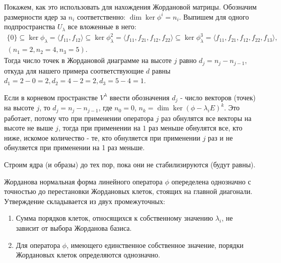 \begin{algorithm}

    Покажем, как это использовать для нахождения Жордановой матрицы. Обозначим размерности ядер за $n_i$ соответственно: $\dim \ker \phi^i = n_i$. Выпишем для одного подпространства $U_{\lambda}$ все вложенные в него:
    \begin{eqnarray}  
        \{0\} \subseteq \ker \phi_{\lambda} = \langle f_{11}, f_{12}\rangle \subseteq \ker \phi_{\lambda}^2 
        = \langle f_{11}, f_{21}, f_{12}, f_{22} \rangle \subseteq \ker \phi_{\lambda}^3 = 
        \langle f_{11}, f_{21}, f_{12}, f_{22}, f_{13} \rangle, \\ (n_1 = 2, n_2 = 4, n_3 = 5).
    \end{eqnarray}
    Тогда число точек в Жордановой диаграмме на высоте $j$ равно $d_j = n_j - n_{j-1}$, откуда для нашего примера соответствующие $d$ равны $d_1 = 2-0=2, d_2 = 4-2=2, d_3 = 5-4=1$.
    
    Если в корневом пространстве $V^{\lambda}$ ввести обозначения $d_j$ - число векторов (точек) на высоте $j$, то $d_j = n_j - n_{j-1}$, где $n_0 = 0$, $n_k = \dim \ker (\phi - \lambda_i E)^k$.
    Это работает, потому что при применении оператора $j$ раз обнулятся все векторы на высоте не выше $j$, 
    тогда при применении на $1$ раз меньше обнулятся все, кто ниже, искомое количество - те, кто обнуляется при применении $j$ раз и не обнуляется при применении на 1 раз меньше.
    
    Строим ядра (и образы) до тех пор, пока они не стабилизируются (будут равны).
\end{algorithm}

\begin{theorem}[]
    Жорданова нормальная форма линейного оператора $\phi$ опеределена однозначно с точностью до перестановки Жордановых клеток, стоящих на главной диагонали. 
    Утверждение складывается из двух промежуточных:
    \begin{enumerate}
        \item Сумма порядков клеток, относящихся к собственному значению $\lambda_i$, не зависит от выбора Жорданова базиса.
        \item Для оператора $\phi$, имеющего единственное собственное значение, порядки Жордановых клеток определяются однозначно.
    \end{enumerate}
\end{theorem}

